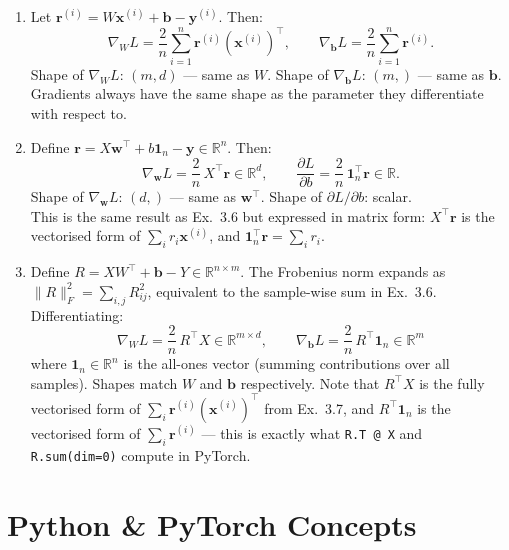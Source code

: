 \documentclass[12pt, a4paper]{scrartcl}
\begin{document}
\begin{enumerate}
\item Let $\mathbf{r}^{(i)} = W\mathbf{x}^{(i)} + \mathbf{b} - \mathbf{y}^{(i)}$. Then:
\[
\nabla_W L = \frac{2}{n}\sum_{i=1}^{n} \mathbf{r}^{(i)} (\mathbf{x}^{(i)})^\top, \qquad \nabla_\mathbf{b} L = \frac{2}{n}\sum_{i=1}^{n} \mathbf{r}^{(i)}.
\]
Shape of $\nabla_W L$: $(m, d)$ --- same as $W$. Shape of $\nabla_\mathbf{b} L$: $(m,)$ --- same as $\mathbf{b}$.\\
Gradients always have the same shape as the parameter they differentiate with respect to.

\item Define $\mathbf{r} = X\mathbf{w}^\top + b\mathbf{1}_n - \mathbf{y} \in \mathbb{R}^n$. Then:
\[
\nabla_\mathbf{w} L = \frac{2}{n}\, X^\top \mathbf{r} \in \mathbb{R}^d, \qquad
\frac{\partial L}{\partial b} = \frac{2}{n}\, \mathbf{1}_n^\top \mathbf{r} \in \mathbb{R}.
\]
Shape of $\nabla_\mathbf{w} L$: $(d,)$ --- same as $\mathbf{w}^\top$. Shape of $\partial L/\partial b$: scalar.\\
This is the same result as Ex.~3.6 but expressed in matrix form: $X^\top \mathbf{r}$ is the vectorised form of $\sum_i r_i \mathbf{x}^{(i)}$, and $\mathbf{1}_n^\top \mathbf{r} = \sum_i r_i$.

\item Define $R = XW^\top + \mathbf{b} - Y \in \mathbb{R}^{n \times m}$. The
Frobenius norm expands as $\|R\|_F^2 = \sum_{i,j} R_{ij}^2$, equivalent to
the sample-wise sum in Ex.~3.6. Differentiating:
\[
\nabla_W L = \frac{2}{n}\, R^\top X \in \mathbb{R}^{m \times d}, \qquad
\nabla_\mathbf{b} L = \frac{2}{n}\, R^\top \mathbf{1}_n \in \mathbb{R}^{m}
\]
where $\mathbf{1}_n \in \mathbb{R}^n$ is the all-ones vector (summing
contributions over all samples). Shapes match $W$ and $\mathbf{b}$
respectively. Note that $R^\top X$ is the fully vectorised form of
$\sum_i \mathbf{r}^{(i)}(\mathbf{x}^{(i)})^\top$ from Ex.~3.7, and
$R^\top \mathbf{1}_n$ is the vectorised form of $\sum_i \mathbf{r}^{(i)}$ ---
this is exactly what \texttt{R.T @ X} and \texttt{R.sum(dim=0)} compute in PyTorch.

\end{enumerate}

\section{Python \& PyTorch Concepts}
\end{document}

